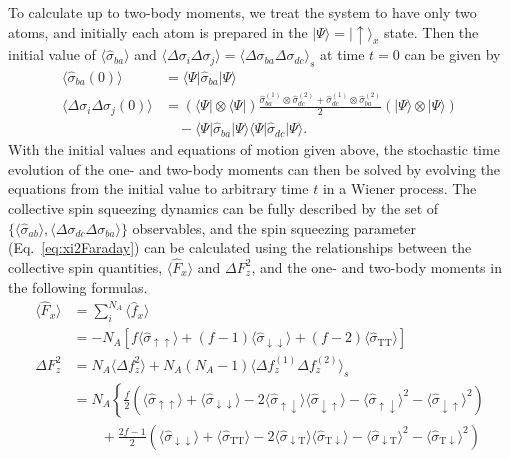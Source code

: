 \documentclass[preprint,aps,pra,onecolumn,superscriptaddress]{revtex4-1} %
\def\bra#1{\langle{#1}\rvert}%
\def\ket#1{\lvert{#1}\rangle}%
\newcommand{\nn}{\nonumber}
\newcommand{\expect}[1]{\big\langle #1 \big\rangle}
\newcommand{\sigmauu}{\hat{\sigma}_{\uparrow\uparrow}}
\newcommand{\sigmaud}{\hat{\sigma}_{\uparrow\downarrow}}
\newcommand{\sigmadu}{\hat{\sigma}_{\downarrow\uparrow}}
\newcommand{\sigmadd}{\hat{\sigma}_{\downarrow\downarrow}}
\newcommand{\sigmadt}{\hat{\sigma}_{\downarrow \mathrm{T}}}
\newcommand{\sigmatd}{\hat{\sigma}_{\mathrm{T}\downarrow}}
\newcommand{\sigmatt}{\hat{\sigma}_{\mathrm{T}\mathrm{T}}}
\begin{document}
\begin{appendix}
To calculate up to two-body moments, we treat the system to have only two atoms, and initially each atom is prepared in the $ \ket{\Psi}=\ket{\uparrow}_x $ state. Then the initial value of $ \expect{\hat{\sigma}_{ba} } $ and $ \expect{\Delta\sigma_i\Delta\sigma_j}=\expect{\Delta\sigma_{ba}\Delta\sigma_{dc}}_s $ at time $ t=0 $ can be given by
\begin{subequations}
\begin{align}
\expect{\hat{\sigma}_{ba}(0)}&=\bra{\Psi}\hat{\sigma}_{ba}\ket{\Psi}\\
\expect{\Delta\sigma_i\Delta\sigma_j(0)} &= (\bra{\Psi}\otimes\bra{\Psi})\frac{\hat{\sigma}_{ba}^{(1)} \otimes\hat{\sigma}_{dc}^{(2)}+\hat{\sigma}_{dc}^{(1)} \otimes\hat{\sigma}_{ba}^{(2)}}{2}(\ket{\Psi}\otimes\ket{\Psi})\nn\\
&\quad-\bra{\Psi}\hat{\sigma}_{ba}\ket{\Psi}\bra{\Psi}\hat{\sigma}_{dc}\ket{\Psi}.
\end{align}
\end{subequations}
With the initial values and equations of motion given above, the stochastic time evolution of the one- and two-body moments can then be solved by evolving the equations from the initial value to arbitrary time $ t $ in a Wiener process. The collective spin squeezing dynamics can be fully described by the set of $ \{\expect{\hat{\sigma}_{ab}},\expect{\Delta\sigma_{dc}\Delta\sigma_{ba}}\} $ observables, and the spin squeezing parameter (Eq.~\eqref{eq:xi2Faraday}) can be calculated using the relationships between the collective spin quantities, $ \expect{\hat{F}_x} $ and $ \Delta F_z^2 $, and the one- and two-body moments in the following formulas. 
\begin{subequations}
	\begin{align}
	\expect{\hat{F}_x} &= \sum_i^{N_A}\expect{\hat{f}_x}\nonumber\\
	&= -N_A \left[f\expect{\sigmauu}+(f-1)\expect{\sigmadd}+(f-2)\expect{\sigmatt } \right]\label{eq:Fx_qutrit}\\
	\Delta F_z^2 &= N_A\expect{\Delta f_z^2} + N_A(N_A-1)\expect{\Delta f_z^{(1)}\Delta f_z^{(2)} }_s\nn\\
	&=N_A\left\{ \frac{f}{2}\left(\expect{\sigmauu}+\expect{\sigmadd}-2\expect{\sigmaud}\expect{\sigmadu}-\expect{\sigmaud}^2-\expect{\sigmadu}^2 \right)\right. \label{eq:DeltaFz2_fz}\\
	&\quad\quad+ \frac{2f-1}{2}\left(\expect{\sigmadd}+\expect{\sigmatt}-2\expect{\sigmadt}\expect{\sigmatd}-\expect{\sigmadt}^2-\expect{\sigmatd}^2 \right)\nn\\

\end{align}
\end{subequations}
\end{appendix}
\end{document}
